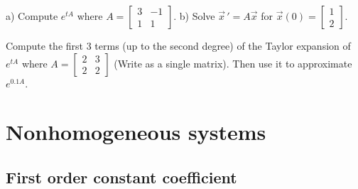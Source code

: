 \documentclass[12pt]{book}
\begin{document}
\begin{exercise}
a) Compute
$e^{tA}$ where
$A=\left[ \begin{smallmatrix}
3 & -1 \\
1 & 1 
\end{smallmatrix}\right]$.  b) Solve $\vec{x}\,' = A \vec{x}$
for $\vec{x}(0) =
\left[ \begin{smallmatrix}
1 \\ 2
\end{smallmatrix}\right]$.
\end{exercise}

\begin{exercise}
Compute the first 3 terms (up to the second degree) of the Taylor expansion of
$e^{tA}$ where
$A=\left[ \begin{smallmatrix}
2 & 3 \\
2 & 2 
\end{smallmatrix}\right]$ (Write as a single matrix).
Then use it to approximate $e^{0.1A}$.
\end{exercise}


\sectionnewpage
\section{Nonhomogeneous systems}


\subsection{First order constant coefficient}
\end{document}
